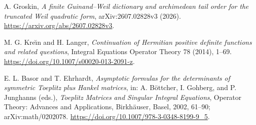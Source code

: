
A. Groskin,
\emph{A finite Guinand--Weil dictionary and archimedean tail order for the
truncated Weil quadratic form},
arXiv:2607.02828v3 (2026).
\url{https://arxiv.org/abs/2607.02828v3}.

M. G. Kre\u{\i}n and H. Langer,
\emph{Continuation of Hermitian positive definite functions and related
questions},
Integral Equations Operator Theory 78 (2014), 1--69.
\url{https://doi.org/10.1007/s00020-013-2091-z}.

E. L. Basor and T. Ehrhardt,
\emph{Asymptotic formulas for the determinants of symmetric Toeplitz plus
Hankel matrices},
in: A. B\"ottcher, I. Gohberg, and P. Junghanns (eds.),
\emph{Toeplitz Matrices and Singular Integral Equations},
Operator Theory: Advances and Applications, Birkh\"auser, Basel, 2002, 61--90;
arXiv:math/0202078.
\url{https://doi.org/10.1007/978-3-0348-8199-9_5}.

